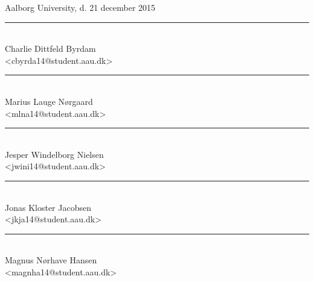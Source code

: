 \vspace{\baselineskip}\hfill Aalborg University, d. 21 december 2015
\vfill\noindent
\begin{minipage}[b]{0.45\textwidth}
 \centering
 \rule{\textwidth}{0.5pt}\\
  Charlie Dittfeld Byrdam\\
 {\footnotesize <cbyrda14@student.aau.dk>}
\end{minipage}
\hfill
\begin{minipage}[b]{0.45\textwidth}
 \centering
 \rule{\textwidth}{0.5pt}\\
  Marius Lauge Nørgaard\\
 {\footnotesize <mlna14@student.aau.dk>}
\end{minipage}
\hfill
\vspace{3\baselineskip}
\begin{minipage}[b]{0.45\textwidth}
 \centering
 \rule{\textwidth}{0.5pt}\\
  Jesper Windelborg Nielsen\\
 {\footnotesize <jwini14@student.aau.dk>}
\end{minipage}
\hfill
\begin{minipage}[b]{0.45\textwidth}
 \centering
 \rule{\textwidth}{0.5pt}\\
  Jonas Kloster Jacobsen\\
 {\footnotesize <jkja14@student.aau.dk>}
\end{minipage}
\hfill
\vspace{3\baselineskip}
\begin{center}
\begin{minipage}[b]{0.45\textwidth}
 \centering
 \rule{\textwidth}{0.5pt}\\
  Magnus Nørhave Hansen\\
 {\footnotesize <magnha14@student.aau.dk>}
\end{minipage}
\hfill
\end{center}